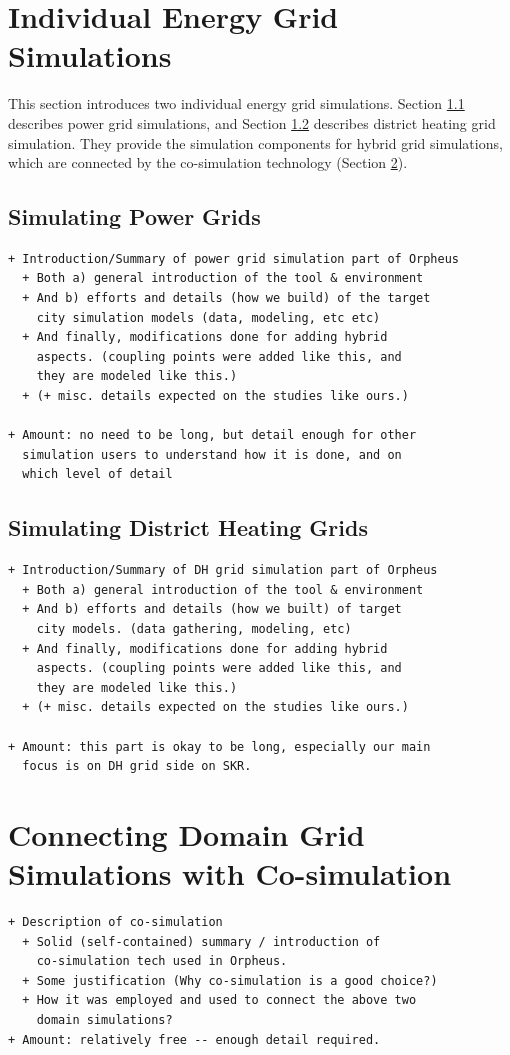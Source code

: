 \documentclass[review]{elsarticle}
\begin{document}
\section{Individual Energy Grid Simulations}
\label{sec:individual_sim}
This section introduces two individual energy grid
simulations. Section \ref{sec:power_sim} describes power grid
simulations, and Section \ref{sec:heat_sim} describes district heating
grid simulation. They provide the simulation components for hybrid grid 
simulations, which are connected by the co-simulation technology
(Section \ref{sec:cosim}). 
\subsection{Simulating Power Grids} 
\label{sec:power_sim}
\begin{verbatim}
+ Introduction/Summary of power grid simulation part of Orpheus
  + Both a) general introduction of the tool & environment 
  + And b) efforts and details (how we build) of the target 
    city simulation models (data, modeling, etc etc) 
  + And finally, modifications done for adding hybrid 
    aspects. (coupling points were added like this, and 
    they are modeled like this.) 
  + (+ misc. details expected on the studies like ours.) 

+ Amount: no need to be long, but detail enough for other 
  simulation users to understand how it is done, and on 
  which level of detail 
\end{verbatim}

\subsection{Simulating District Heating Grids}
\label{sec:heat_sim}
\begin{verbatim}
+ Introduction/Summary of DH grid simulation part of Orpheus 
  + Both a) general introduction of the tool & environment 
  + And b) efforts and details (how we built) of target 
    city models. (data gathering, modeling, etc) 
  + And finally, modifications done for adding hybrid 
    aspects. (coupling points were added like this, and 
    they are modeled like this.) 
  + (+ misc. details expected on the studies like ours.) 

+ Amount: this part is okay to be long, especially our main 
  focus is on DH grid side on SKR. 
\end{verbatim}
\section{Connecting Domain Grid Simulations with Co-simulation}
\label{sec:cosim}
\begin{verbatim}
+ Description of co-simulation 
  + Solid (self-contained) summary / introduction of 
    co-simulation tech used in Orpheus. 
  + Some justification (Why co-simulation is a good choice?) 
  + How it was employed and used to connect the above two 
    domain simulations? 
+ Amount: relatively free -- enough detail required. 
\end{verbatim}
\end{document}
